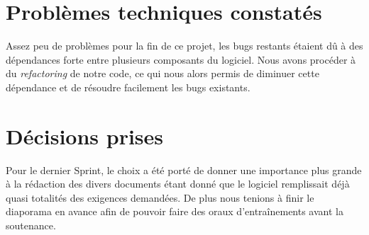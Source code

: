 \documentclass[12pt,a4paper,openany]{article}
\begin{document}
	
	\section{Problèmes techniques constatés}
	Assez peu de problèmes pour la fin de ce projet, les bugs restants étaient dû à des dépendances forte entre plusieurs composants du logiciel. Nous avons procéder à du \textit{refactoring} de notre code, ce qui nous alors permis de diminuer cette dépendance et de résoudre facilement les bugs existants. 

	\section{Décisions prises}
	Pour le dernier Sprint, le choix a été porté de donner une importance plus grande à la rédaction des divers documents étant donné que le logiciel remplissait déjà quasi totalités des exigences demandées.
	De plus nous tenions à finir le diaporama en avance afin de pouvoir faire des oraux d’entraînements avant la soutenance. 

	
\end{document}
